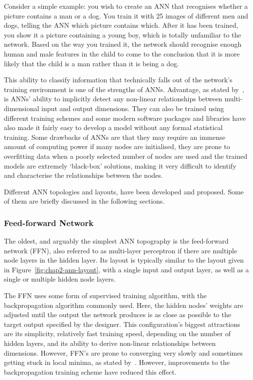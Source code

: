 Consider a simple example: you wish to create an ANN that recognises whether a picture contains a man or a dog. You train it with 25 images of different men and dogs, telling the ANN which picture contains which. After it has been trained, you show it a picture containing a young boy, which is totally unfamiliar to the network. Based on the way you trained it, the network should recognise enough human and male features in the child to come to the conclusion that it is more likely that the child is a man rather than it is being a dog. 

This ability to classify information that technically falls out of the network's training environment is one of the strengths of ANNs. Advantage, as stated by~\cite{tu1996advantages}, is ANNs' ability to implicitly detect any non-linear relationships between multi-dimensional input and output dimensions. They can also be trained using different training schemes and some modern software packages and libraries have also made it fairly easy to develop a model without any formal statistical training. Some drawbacks of ANNs are that they may require an immense amount of computing power if many nodes are initialised, they are prone to overfitting data when a poorly selected number of nodes are used and the trained models are extremely `black-box' solutions, making it very difficult to identify and characterise the relationships between the nodes. 

Different ANN topologies and layouts, have been developed and proposed. Some of them are briefly discussed in the following sections.

\subsubsection{Feed-forward Network}

The oldest, and arguably the simplest ANN topography is the feed-forward network (FFN), also referred to as multi-layer perceptron if there are multiple node layers in the hidden layer. Its layout is typically similar to the layout given in Figure~\ref{fig:chap2-ann-layout}, with a single input and output layer, as well as a single or multiple hidden node layers. 

The FFN uses some form of supervised training algorithm, with the backpropagation algorithm commonly used. Here, the hidden nodes' weights are adjusted until the output the network produces is as close as possible to the target output specified by the designer. This configuration's biggest attractions are its simplicity, relatively fast training speed, depending on the number of hidden layers, and its ability to derive non-linear relationships between dimensions. However, FFN's are prone to converging very slowly and sometimes getting stuck in local minima, as stated by~\cite{svozil1997introduction}. However, improvements to the backpropagation training scheme have reduced this effect.

